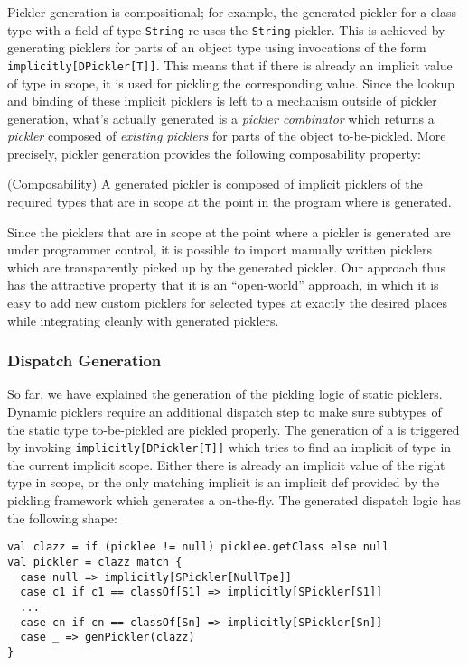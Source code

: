 Pickler generation is compositional; for example, the generated pickler for a
class type with a field of type \verb|String| re-uses the \verb|String| pickler. This is
achieved by generating picklers for parts of an object type using invocations
of the form \verb|implicitly[DPickler[T]]|. This means that if there is
already an implicit value of type  in scope, it is used for
pickling the corresponding value. Since the lookup and binding of these
implicit picklers is left to a mechanism outside of pickler generation, what's
actually generated is a {\em pickler combinator} which returns a {\em pickler}
composed of {\em existing picklers} for parts of the object to-be-pickled.
More precisely, pickler generation provides the following composability
property:

\begin{prop}{(Composability)}
A generated pickler  is composed of implicit picklers of the required
types that are in scope at the point in the program where  is
generated.
\end{prop}

Since the picklers that are in scope at the point where a pickler is generated
are under programmer control, it is possible to import manually written
picklers which are transparently picked up by the generated pickler. Our
approach thus has the attractive property that it is an ``open-world''
approach, in which it is easy to add new custom picklers for selected types at
exactly the desired places while integrating cleanly with generated picklers.

\subsubsection{Dispatch Generation}

So far, we have explained the generation of the pickling logic of static
picklers. Dynamic picklers require an additional dispatch step to make sure
subtypes of the static type to-be-pickled are pickled properly. The generation
of a  is triggered by invoking
\verb|implicitly[DPickler[T]]| which tries to find an implicit of type
 in the current implicit scope. Either there is already an
implicit value of the right type in scope, or the only matching implicit is an
implicit def provided by the pickling framework which generates a
 on-the-fly. The generated dispatch logic has the following
shape:

\begin{lstlisting}
val clazz = if (picklee != null) picklee.getClass else null
val pickler = clazz match {
  case null => implicitly[SPickler[NullTpe]]
  case c1 if c1 == classOf[S1] => implicitly[SPickler[S1]]
  ...
  case cn if cn == classOf[Sn] => implicitly[SPickler[Sn]]
  case _ => genPickler(clazz)
}
\end{lstlisting}

